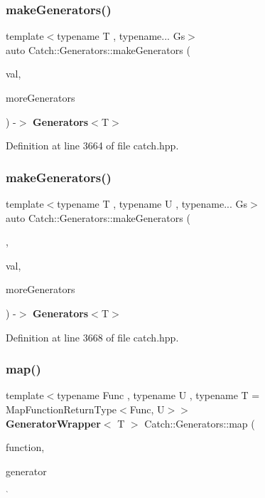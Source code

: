 \subsubsection{makeGenerators()\hspace{0.1cm}{\footnotesize\ttfamily [3/4]}}
{\footnotesize\ttfamily template$<$typename T , typename... Gs$>$ \\
auto Catch\+::\+Generators\+::make\+Generators (\begin{DoxyParamCaption}\item[{T \&\&}]{val,  }\item[{Gs...}]{more\+Generators }\end{DoxyParamCaption}) -\/$>$ \textbf{ Generators}$<$T$>$ }



Definition at line 3664 of file catch.\+hpp.

\mbox{\label{namespace_catch_1_1_generators_a4032a75da538c6897f826399368e16ed}} 
\subsubsection{makeGenerators()\hspace{0.1cm}{\footnotesize\ttfamily [4/4]}}
{\footnotesize\ttfamily template$<$typename T , typename U , typename... Gs$>$ \\
auto Catch\+::\+Generators\+::make\+Generators (\begin{DoxyParamCaption}\item[{\textbf{ as}$<$ T $>$}]{,  }\item[{U \&\&}]{val,  }\item[{Gs...}]{more\+Generators }\end{DoxyParamCaption}) -\/$>$ \textbf{ Generators}$<$T$>$ }



Definition at line 3668 of file catch.\+hpp.

\mbox{\label{namespace_catch_1_1_generators_af33fd06c51ac9173c3bee2ddee2559a6}} 
\subsubsection{map()}
{\footnotesize\ttfamily template$<$typename Func , typename U , typename T  = Map\+Function\+Return\+Type$<$\+Func, U$>$$>$ \\
\textbf{ Generator\+Wrapper}$<$ T $>$ Catch\+::\+Generators\+::map (\begin{DoxyParamCaption}\item[{Func \&\&}]{function,  }\item[{\textbf{ Generator\+Wrapper}$<$ U $>$ \&\&}]{generator }\end{DoxyParamCaption})}



